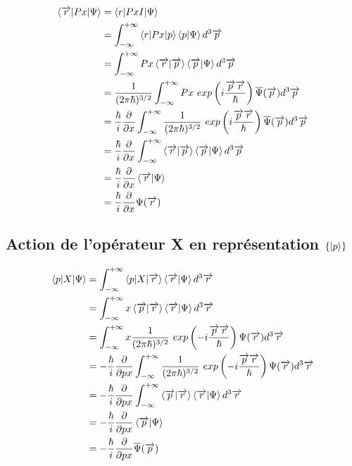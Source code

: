 \documentclass[12pt,a4paper,titlepage]{book}
\begin{document}
\begin{align*}
\braket{\overrightarrow{r} \vert Px \vert \Psi} &= \braket{r \vert Px I \vert \Psi}\\
&= \int_{- \infty}^{+ \infty} \braket{r \vert Px \vert p} \braket{p \vert \Psi} d^3 \overrightarrow{p}\\
&= \int_{- \infty}^{+ \infty} Px \braket{\overrightarrow{r} \vert \overrightarrow{p}} \braket{\overrightarrow{p} \vert \Psi} d^3 \overrightarrow{p}\\
&= \frac{1}{(2 \pi \hbar)^{3/2}} \int_{- \infty}^{+ \infty} Px ~exp \left( i \frac{\overrightarrow{p} \overrightarrow{r}}{\hbar} \right) \overline{\Psi} (\overrightarrow{p}) d^3 \overrightarrow{p}\\
&= \frac{\hbar}{i} \frac{\partial}{\partial x} \int_{- \infty}^{+ \infty} \frac{1}{(2 \pi \hbar)^{3/2}} ~exp \left( i \frac{\overrightarrow{p} \overrightarrow{r}}{\hbar} \right) \overline{\Psi} (\overrightarrow{p}) d^3 \overrightarrow{p}\\
&= \frac{\hbar}{i} \frac{\partial}{\partial x} \int_{- \infty}^{+ \infty} \braket{\overrightarrow{r} \vert \overrightarrow{p}} \braket{\overrightarrow{p} \vert \Psi} d^3 \overrightarrow{p}\\
&= \frac{\hbar}{i} \frac{\partial}{\partial x} \braket{\overrightarrow{r} \vert \Psi}\\
&= \frac{\hbar}{i} \frac{\partial}{\partial x} \Psi (\overrightarrow{r})
\end{align*}

\subsection{Action de l'opérateur X en représentation $\lbrace \ket p \rbrace$}

\begin{align*}
\braket{p \vert X \vert \Psi} &= \int_{- \infty}^{+ \infty} \braket{p \vert X \vert \overrightarrow{r}} \braket{\overrightarrow{r} \vert \Psi} d^3 \overrightarrow{r}\\
&= \int_{- \infty}^{+ \infty} x \braket{\overrightarrow{p} \vert \overrightarrow{r}} \braket{\overrightarrow{r} \vert \Psi} d^3 \overrightarrow{r}\\
&= \int_{- \infty}^{+ \infty} x \frac{1}{(2 \pi \hbar)^{3/2}} ~exp \left( -i \frac{\overrightarrow{p} \overrightarrow{r}}{\hbar} \right) \Psi (\overrightarrow{r}) d^3 \overrightarrow{r}\\
&= -\frac{\hbar}{i} \frac{\partial}{\partial px} \int_{- \infty}^{+ \infty} \frac{1}{(2 \pi \hbar)^{3/2}} ~exp \left( -i \frac{\overrightarrow{p} \overrightarrow{r}}{\hbar} \right) \Psi (\overrightarrow{r}) d^3 \overrightarrow{r}\\
&= - \frac{\hbar}{i} \frac{\partial}{\partial px} \int_{- \infty}^{+ \infty} \braket{\overrightarrow{p} \vert \overrightarrow{r}} \braket{\overrightarrow{r} \vert \Psi} d^3 \overrightarrow{r}\\
&= -\frac{\hbar}{i} \frac{\partial}{\partial px} \braket{\overrightarrow{p} \vert \Psi}\\
&= -\frac{\hbar}{i} \frac{\partial}{\partial px} \overline{\Psi} (\overrightarrow{p})
\end{align*}
\end{document}
